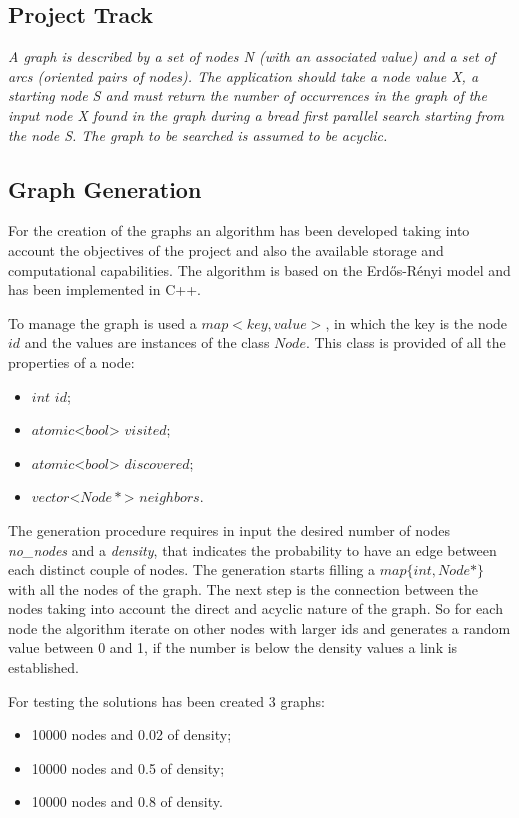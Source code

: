 \subsection{Project Track}
\textit{A graph is described by a set of nodes N (with an associated value) and a set of arcs (oriented pairs of nodes). The application should take a node value X, a starting node S and must return the number of occurrences in the graph of the input node X found in the graph during a bread first parallel search starting from the node S. The graph to be searched is assumed to be acyclic.}

\subsection{Graph Generation}
\label{sec:graph}
For the creation of the graphs an algorithm has been developed taking into account the objectives of the project and also the available storage and computational capabilities. The algorithm is based on the Erdős-Rényi model and has been implemented in C++.

To manage the graph is used a $map<key, value>$, in which the key is the node $id$ and the values are instances of the class $Node$. This class is provided of all the properties of a node:

\begin{itemize}
    \item $int$ $id$;
    \item $atomic$<$bool$> $visited$;
    \item $atomic$<$bool$> $discovered$;
    \item $vector$<$Node*$> $neighbors$.
\end{itemize}

The generation procedure requires in input the desired number of nodes \textit{no\_nodes} and a \textit{density}, that indicates the probability to have an edge between each distinct couple of nodes.  The generation starts filling a $map\{int, Node*\}$ with all the nodes of the graph. The next step is the connection between the nodes taking into account the direct and acyclic nature of the graph. So for each node the algorithm iterate on other nodes with larger ids and generates a random value between 0 and 1, if the number is below the density values a link is established. 

For testing the solutions has been created 3 graphs:
\begin{itemize}
    \item 10000 nodes and 0.02 of density;
    \item 10000 nodes and 0.5 of density;
    \item 10000 nodes and 0.8 of density.
\end{itemize}

